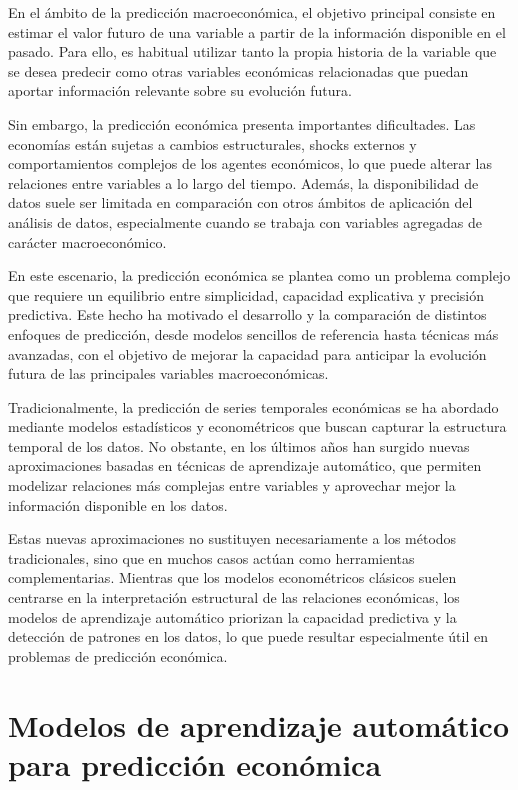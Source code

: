En el ámbito de la predicción macroeconómica, el objetivo principal consiste en estimar el valor futuro de una variable a partir de la información disponible en el pasado. Para ello, es habitual utilizar tanto la propia historia de la variable que se desea predecir como otras variables económicas relacionadas que puedan aportar información relevante sobre su evolución futura.

Sin embargo, la predicción económica presenta importantes dificultades. Las economías están sujetas a cambios estructurales, shocks externos y comportamientos complejos de los agentes económicos, lo que puede alterar las relaciones entre variables a lo largo del tiempo. Además, la disponibilidad de datos suele ser limitada en comparación con otros ámbitos de aplicación del análisis de datos, especialmente cuando se trabaja con variables agregadas de carácter macroeconómico.

En este escenario, la predicción económica se plantea como un problema complejo que requiere un equilibrio entre simplicidad, capacidad explicativa y precisión predictiva. Este hecho ha motivado el desarrollo y la comparación de distintos enfoques de predicción, desde modelos sencillos de referencia hasta técnicas más avanzadas, con el objetivo de mejorar la capacidad para anticipar la evolución futura de las principales variables macroeconómicas. \citep{green_armstrong_2015}

Tradicionalmente, la predicción de series temporales económicas se ha abordado mediante modelos estadísticos y econométricos que buscan capturar la estructura temporal de los datos. No obstante, en los últimos años han surgido nuevas aproximaciones basadas en técnicas de aprendizaje automático, que permiten modelizar relaciones más complejas entre variables y aprovechar mejor la información disponible en los datos.

Estas nuevas aproximaciones no sustituyen necesariamente a los métodos tradicionales, sino que en muchos casos actúan como herramientas complementarias. Mientras que los modelos econométricos clásicos suelen centrarse en la interpretación estructural de las relaciones económicas, los modelos de aprendizaje automático priorizan la capacidad predictiva y la detección de patrones en los datos, lo que puede resultar especialmente útil en problemas de predicción económica.

\section{Modelos de aprendizaje automático para predicción económica}

